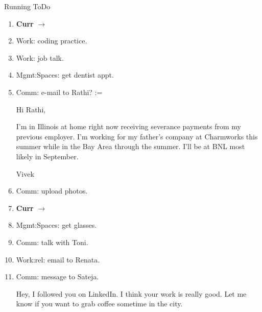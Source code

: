 \begin{columns}
\begin{column}{0.6\linewidth}
\begin{block}{Running ToDo}

      \begin{enumerate}

        
      \item \tiny \textbf{Curr} $\rightarrow$ 
        
      \item \tiny Work: coding practice. 
      \item \tiny Work: job talk.

      \item \tiny Mgmt:Spaces: get dentist appt.
 
      \item \tiny Comm: e-mail to Rathi?  := 
        
        Hi Rathi, 
        
        I'm in Illinois at home right now receiving severance payments from my
        previous employer. I'm working for my father's company at Charmworks
        this summer while in the Bay Area through the summer. I'll be
        at BNL most likely in September.
        
        Vivek

      
      \item \tiny Comm: upload photos.
      \item \tiny \textbf{Curr} $\rightarrow$ 
      \item \tiny Mgmt:Spaces: get glasses.   
      \item \tiny Comm: talk with Toni. 
      \item \tiny Work:rel: email to Renata.  
      \item \tiny Comm: message to Sateja.
        
        Hey, I followed you on LinkedIn. I think your work is really good. 
        Let me know if you want to grab coffee sometime in the city. 
        

\end{enumerate}
\end{block}
\end{column}
\end{columns}
